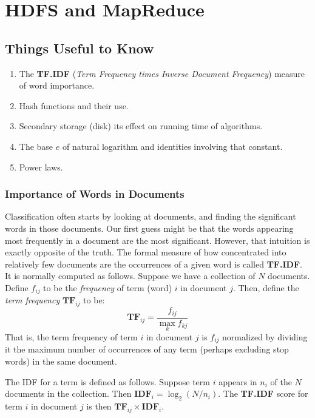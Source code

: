 \chapter{HDFS and MapReduce}\label{chap:hdfs-map-reduce}

\section{Things Useful to Know}\label{sec:things-useful-to-know}

\begin{enumerate}
    \item The \textbf{TF.IDF} (\textit{Term Frequency times Inverse Document Frequency}) measure of word importance.
    \item Hash functions and their use.
    \item Secondary storage (disk) its effect on running time of algorithms.
    \item The base $e$ of natural logarithm and identities involving that constant.
    \item Power laws.
\end{enumerate}

\subsection{Importance of Words in Documents}\label{subsec:importance-of-words-in-documents}

Classification often starts by looking at documents, and finding the significant words in those documents. Our first guess might be that the words appearing most frequently in a document are the most significant. However, that intuition is exactly opposite of the truth. The formal measure of how concentrated into relatively few documents are the occurrences of a given word is called \textbf{TF.IDF}. It is normally computed as follows. Suppose we have a collection of $N$ documents. Define $f_{ij}$ to be the \textit{frequency} of term (word) $i$ in document $j$. Then, define the \textit{term frequency} $\bm{TF}_{ij}$ to be:
\begin{equation*}\label{eq:tf}
    \bm{TF}_{ij} = \frac{f_{ij}}{\max_{k} f_{kj}}
\end{equation*}
That is, the term frequency of term $i$ in document $j$ is $f_{ij}$ normalized by dividing it the maximum number of occurrences of any term (perhaps excluding stop words) in the same document. 

The IDF for a term is defined as follows. Suppose term $i$ appears in $n_i$ of the $N$ documents in the collection. Then $\bm{IDF}_i = \log_2(N/n_i)$. The \textbf{TF.IDF} score for term $i$ in document $j$ is then $\bm{TF}_{ij} \times \bm{IDF}_i$.

